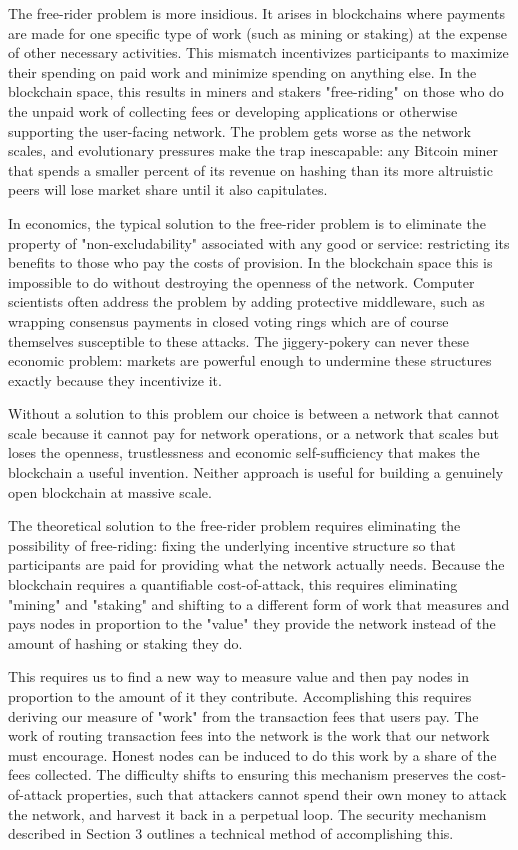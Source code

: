 \documentclass[11pt, oneside]{article}   	%
\begin{document}
\begin{multicols}{2}
The free-rider problem is more insidious. It arises in blockchains where payments are made for one specific type of work (such as mining or staking) at the expense of other necessary activities. This mismatch incentivizes participants to maximize their spending on paid work and minimize spending on anything else. In the blockchain space, this results in miners and stakers "free-riding" on those who do the unpaid work of collecting fees or developing applications or otherwise supporting the user-facing network. The problem gets worse as the network scales, and evolutionary pressures make the trap inescapable: any Bitcoin miner that spends a smaller percent of its revenue on hashing than its more altruistic peers will lose market share until it also capitulates.

In economics, the typical solution to the free-rider problem is to eliminate the property of "non-excludability" associated with any good or service: restricting its benefits to those who pay the costs of provision. In the blockchain space this is impossible to do without destroying the openness of the network. Computer scientists often address the problem by adding protective middleware, such as wrapping consensus payments in closed voting rings which are of course themselves susceptible to these attacks. The jiggery-pokery can never these economic problem: markets are powerful enough to undermine these structures exactly because they incentivize it.

Without a solution to this problem our choice is between a network that cannot scale because it cannot pay for network operations, or a network that scales but loses the openness, trustlessness and economic self-sufficiency that makes the blockchain a useful invention. Neither approach is useful for building a genuinely open blockchain at massive scale.

The theoretical solution to the free-rider problem requires eliminating the possibility of free-riding: fixing the underlying incentive structure so that participants are paid for providing what the network actually needs. Because the blockchain requires a quantifiable cost-of-attack, this requires eliminating "mining" and "staking" and shifting to a different form of work that measures and pays nodes in proportion to the "value" they provide the network instead of the amount of hashing or staking they do.

This requires us to find a new way to measure value and then pay nodes in proportion to the amount of it they contribute. Accomplishing this requires deriving our measure of "work" from the transaction fees that users pay. The work of routing transaction fees into the network is the work that our network must encourage. Honest nodes can be induced to do this work by a share of the fees collected. The difficulty shifts to ensuring this mechanism preserves the cost-of-attack properties, such that attackers cannot spend their own money to attack the network, and harvest it back in a perpetual loop. The security mechanism described in Section 3 outlines a technical method of accomplishing this.



\end{multicols}
\end{document}

